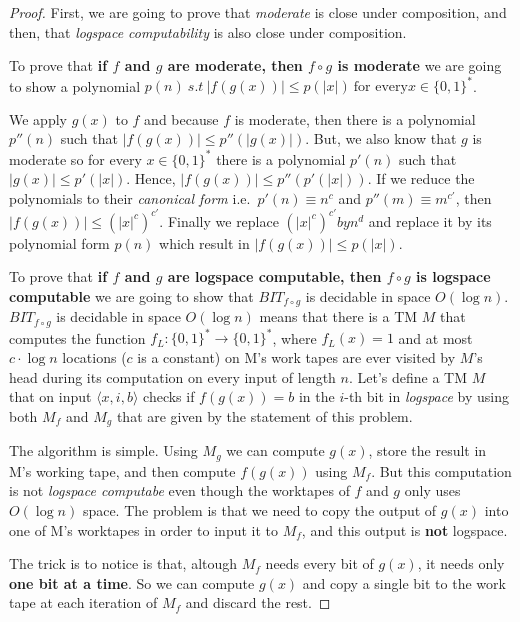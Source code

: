 \documentclass[12pt, a4paper]{article}
\begin{document}
\begin{proof}
  First, we are going to prove that \textit{moderate} is close under composition, and then, that \textit{logspace computability} is also close under composition.


  To prove that \textbf{if $f$ and $g$ are moderate, then $f \circ g$ is moderate} we are going to show a polynomial $p(n)\ s.t\ |f(g(x))| \leq p(|x|) \ \text{for every} x \in \{ 0, 1 \} ^*$.


  We apply $g(x)$ to $f$ and because $f$ is moderate, then there is a polynomial $p''(n)$ such that $|f(g(x))| \leq p''(|g(x)|)$. But, we also know that $g$ is moderate so for every $x \in \{ 0, 1 \} ^*$ there is a polynomial $p'(n)$ such that $|g(x)| \leq p'(|x|)$. Hence, $|f(g(x))| \leq p''(p'(|x|))$. If we reduce the polynomials to their \textit{canonical form} i.e.\ $p'(n) \equiv n^c $ and $p''(m) \equiv m^{c'} $, then $|f(g(x))| \leq (|x|^c)^{c'}$. Finally we replace $(|x|^c)^{c'} by n^d$ and replace it by its polynomial form $p(n)$ which result in $|f(g(x))| \leq p(|x|)$.


  To prove that \textbf{if $f$ and $g$ are logspace computable, then $f \circ g$ is logspace computable} we are going to show that $BIT_{f \circ g}$ is decidable in space $O(\log n)$. $BIT_{f \circ g}$ is decidable in space $O(\log n)$ means that there is a TM $M$ that computes the function $f_L: \{ 0,1 \} ^* \to  \{ 0,1 \} ^*$, where $f_L(x) = 1$ and at most $c \cdot \log n$ locations ($c$ is a constant) on M's work tapes are ever visited by $M$'s head during its computation on every input of length $n$. Let's define a TM $M$ that on input $\langle x, i, b \rangle$ checks if $f(g(x)) = b$ in the $i$-th bit in \textit{logspace} by using both $M_f$ and $M_g$ that are given by the statement of this problem.


  The algorithm is simple. Using $M_g$ we can compute $g(x)$, store the result in M's working tape, and then compute $f(g(x))$ using $M_f$. But this computation is not \textit{logspace computabe} even though the worktapes of $f$ and $g$ only uses $O(\log n)$ space. The problem is that we need to copy the output of $g(x)$ into one of M's worktapes in order to input it to $M_f$, and this output is \textbf{not} logspace.


  The trick is to notice is that, altough $M_f$ needs every bit of $g(x)$, it needs only \textbf{one bit at a time}. So we can compute $g(x)$ and copy a single bit to the work tape at each iteration of $M_f$ and discard the rest.



\end{proof}
\end{document}
